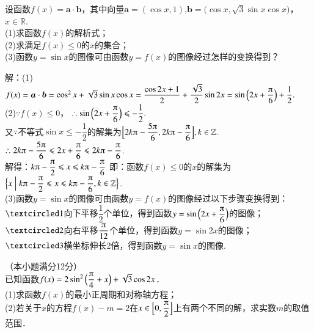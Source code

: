 \begin{exercise}
      设函数$f(x)=\bm a\cdot\bm b$，其中向量$\bm a=(\cos x,1)$,$\bm b=\bigl(\cos x,\sqrt3\sin x\cos x\bigr)$，$x\in\mathbb{R}$.\\
      (1)求函数$f(x)$的解析式；\\
      (2)求满足$f(x)\leqslant0$的$x$的集合；\\
      (3)函数$y=\sin x$的图像可由函数$y=f(x)$的图像经过怎样的变换得到？\\
      \begin{answer}
        解：(1)$f(x)=\bm a\cdot\bm b
        =\cos^2x+\sqrt3\sin x\cos x
        =\dfrac{\cos{2x}+1}2+\dfrac{\sqrt3}{2}\sin{2x}
        =\sin{\Bigl(2x+\dfrac{\piup}6\Bigr)}+\dfrac12.$\\
        (2)$\because f(x)\leqslant0$，
        $\therefore \sin{\Bigl(2x+\dfrac{\piup}6\Bigr)}\leqslant-\dfrac12.$\\
        又$\because$不等式$\sin x\leqslant-\dfrac12$的解集为$\Bigl[2k\piup-\dfrac{5\piup}6,2k\piup-\dfrac{\piup}6\Bigr],k\in\mathbb{Z}.$\\
        $\therefore 2k\piup-\dfrac{5\piup}6 \leqslant 2x+\dfrac{\piup}6 \leqslant 2k\piup-\dfrac{\piup}6$.\\
        解得：$k\piup-\dfrac{\piup}2 \leqslant x \leqslant k\piup-\dfrac{\piup}6$
        即：函数$f(x)\leqslant0$的$x$的解集为$\Bigl\{x\Bigm| k\piup-\dfrac{\piup}2 \leqslant x \leqslant k\piup-\dfrac{\piup}6,k\in\mathbb{Z}\Bigr\}$.\\
        (3)函数$y=\sin x$的图像可由函数$y=f(x)$的图像经过以下步骤变换得到：\\
        $\circled{1}$向下平移$\dfrac12$个单位，得到函数$y=\sin{\Bigl(2x+\dfrac{\piup}6\Bigr)}$的图像；\\
        $\circled{2}$向右平移$\dfrac{\piup}{12}$个单位，得到函数$y=\sin {2x}$的图像；\\
        $\circled{3}$横坐标伸长2倍，得到函数$y=\sin x$的图像.
      \end{answer}
    \vspace{3.6cm}
    \item
      （本小题满分12分）\\
      已知函数$f(x)=2\sin^2{\Bigl(\dfrac{\piup}4+x\Bigr)}+\sqrt3\cos{2x}$．\\
      (1)求函数$f(x)$的最小正周期和对称轴方程；\\
      (2)若关于$x$的方程$f(x)-m=2$在$x\in\Bigl[0,\dfrac{\piup}2\Bigr]$上有两个不同的解，求实数$m$的取值范围．\\
      \begin{answer}

\end{answer}
\end{exercise}
